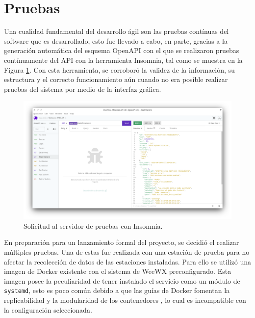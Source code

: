 \section{Pruebas}



Una cualidad fundamental del desarrollo ágil son las pruebas contínuas del software que es desarrollado, esto fue llevado a cabo, en parte, gracias a la generación automática del esquema OpenAPI con el que se realizaron pruebas contínuamente del API con la herramienta Insomnia, tal como se muestra en la Figura \ref{fig:insomnia-stations-request}. Con esta herramienta, se corroboró la validez de la información, su estructura y el correcto funcionamiento aún cuando no era posible realizar pruebas del sistema por medio de la interfaz gráfica.

\begin{figure}[!ht]
	\centering
	\includegraphics[width=1\linewidth]{images/screenshots/insomnia_stations.png}
	\caption{Solicitud al servidor de pruebas con Insomnia.}
	\label{fig:insomnia-stations-request}
\end{figure}

En preparación para un lanzamiento formal del proyecto, se decidió el realizar múltiples pruebas. Una de estas fue realizada con una estación de prueba para no afectar la recolección de datos de las estaciones instaladas. Para ello se utilizó una imagen de Docker existente con el sistema de WeeWX preconfigurado. Esta imagen posee la peculiaridad de tener instalado el servicio como un módulo de \texttt{systemd}, esto es poco común debido a que las guías de Docker fomentan la replicabilidad y la modularidad de los contenedores \cite{docker_multi_service}, lo cual es incompatible con la configuración seleccionada.

